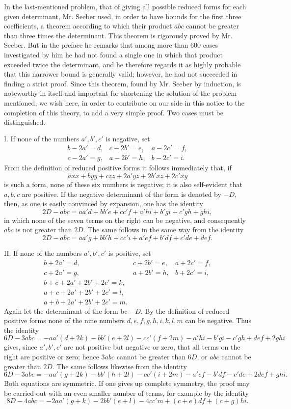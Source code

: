 \documentclass[12pt]{article}
\begin{document}
In the last-mentioned problem, that of giving all possible reduced forms for each given determinant, Mr. Seeber used, in order to have bounds for the first three coefficients, a theorem according to which their product $abc$ cannot be greater than three times the determinant. This theorem is rigorously proved by Mr. Seeber. But in the preface he remarks that among more than 600 cases investigated by him he had not found a single one in which that product exceeded twice the determinant, and he therefore regards it as highly probable that this narrower bound is generally valid; however, he had not succeeded in finding a strict proof. Since this theorem, found by Mr. Seeber by induction, is noteworthy in itself and important for shortening the solution of the problem mentioned, we wish here, in order to contribute on our side in this notice to the completion of this theory, to add a very simple proof. Two cases must be distinguished.

I. If none of the numbers $a',b',c'$ is negative, set
\[
\begin{array}{lll}
b-2a'=d, & c-2b'=e, & a-2c'=f,\\
c-2a'=g, & a-2b'=h, & b-2c'=i.
\end{array}
\]
From the definition of reduced positive forms it follows immediately that, if
\[
axx+byy+czz+2a'yz+2b'xz+2c'xy
\]
is such a form, none of these six numbers is negative; it is also self-evident that $a,b,c$ are positive. If the negative determinant of the form is denoted by $-D$, then, as one is easily convinced by expansion, one has the identity
\[
2D-abc=aa'd+bb'e+cc'f+a'hi+b'gi+c'gh+ghi,
\]
in which none of the seven terms on the right can be negative, and consequently $abc$ is not greater than $2D$. The same follows in the same way from the identity
\[
2D-abc=aa'g+bb'h+cc'i+a'ef+b'df+c'de+def.
\]

II. If none of the numbers $a',b',c'$ is positive, set
\[
\begin{array}{lll}
b+2a'=d, & c+2b'=e, & a+2c'=f,\\
c+2a'=g, & a+2b'=h, & b+2c'=i,\\[2pt]
b+c+2a'+2b'+2c'=k,\\
a+c+2a'+2b'+2c'=l,\\
a+b+2a'+2b'+2c'=m.
\end{array}
\]
Again let the determinant of the form be $-D$. By the definition of reduced positive forms none of the nine numbers $d,e,f,g,h,i,k,l,m$ can be negative. Thus the identity
\[
6D-3abc=-aa'(d+2k)-bb'(e+2l)-cc'(f+2m)-a'hi-b'gi-c'gh+def+2ghi
\]
gives, since $a',b',c'$ are not positive but negative or zero, that all terms on the right are positive or zero; hence $3abc$ cannot be greater than $6D$, or $abc$ cannot be greater than $2D$. The same follows likewise from the identity
\[
6D-3abc=-aa'(g+2k)-bb'(h+2l)-cc'(i+2m)-a'ef-b'df-c'de+2def+ghi.
\]
Both equations are symmetric. If one gives up complete symmetry, the proof may be carried out with an even smaller number of terms, for example by the identity
\[
8D-4abc=-2aa'(g+k)-2bb'(e+l)-4cc'm+(c+e)df+(c+g)hi.
\]
\end{document}

